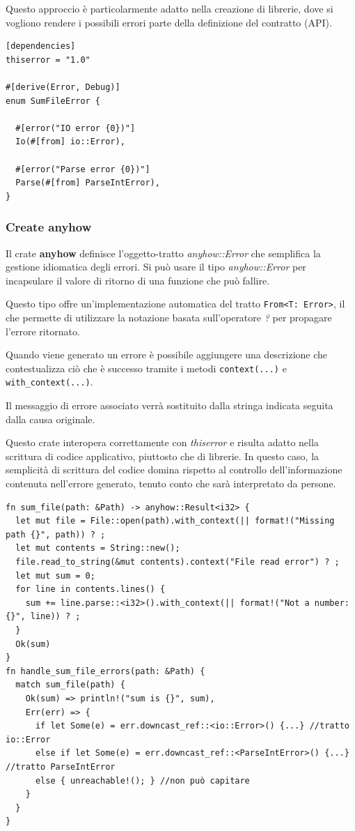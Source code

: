 Questo approccio è particolarmente adatto nella creazione di librerie, dove si
vogliono rendere i possibili errori parte della definizione del contratto (API).

\begin{verbatim}
[dependencies]
thiserror = "1.0"

#[derive(Error, Debug)]
enum SumFileError {

  #[error("IO error {0})"]
  Io(#[from] io::Error),

  #[error("Parse error {0})"]
  Parse(#[from] ParseIntError),
}
\end{verbatim}

\subsubsection{Create anyhow}

Il crate \textbf{anyhow} definisce l'oggetto-tratto \textit{anyhow::Error} che semplifica la
gestione idiomatica degli errori.
Si può usare il tipo \textit{anyhow::Error} per incapsulare il valore di ritorno di
una funzione che può fallire.

Questo tipo offre un'implementazione automatica del tratto \texttt{From<T: Error>}, il
che permette di utilizzare la notazione basata sull'operatore \textit{?} per propagare
l'errore ritornato.

Quando viene generato un errore è possibile aggiungere una descrizione che contestualizza ciò che è
successo tramite i metodi \texttt{context(...)} e \texttt{with_context(...)}.

Il messaggio di errore associato verrà sostituito dalla stringa indicata seguita
dalla causa originale.

Questo crate interopera correttamente con \textit{thiserror} e risulta adatto nella
scrittura di codice applicativo, piuttosto che di librerie.
In questo caso, la semplicità di scrittura del codice domina rispetto al
controllo dell'informazione contenuta nell'errore generato, tenuto conto che
sarà interpretato da persone.


\begin{verbatim}
fn sum_file(path: &Path) -> anyhow::Result<i32> {
  let mut file = File::open(path).with_context(|| format!("Missing path {}", path)) ? ;
  let mut contents = String::new();
  file.read_to_string(&mut contents).context("File read error") ? ;
  let mut sum = 0;
  for line in contents.lines() {
    sum += line.parse::<i32>().with_context(|| format!("Not a number: {}", line)) ? ;
  }
  Ok(sum)
}
fn handle_sum_file_errors(path: &Path) {
  match sum_file(path) {
    Ok(sum) => println!("sum is {}", sum),
    Err(err) => {
      if let Some(e) = err.downcast_ref::<io::Error>() {...} //tratto io::Error
      else if let Some(e) = err.downcast_ref::<ParseIntError>() {...} //tratto ParseIntError
      else { unreachable!(); } //non può capitare
    }
  }
}  
\end{verbatim}
